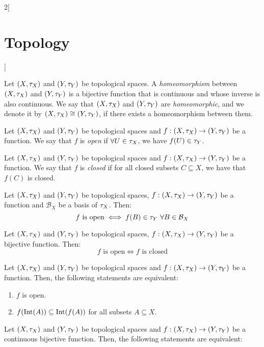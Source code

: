 \documentclass[../../../main.tex]{subfiles}
\begin{document}
\begin{multicols}{2}[\section{Topology}]
\begin{proposition}
  \end{proposition}
  \begin{definition}
    Let $(X,\tau_X)$ and $(Y,\tau_Y)$ be topological spaces. A \emph{homeomorphism} between $(X,\tau_X)$ and $(Y,\tau_Y)$ is a bijective function that is continuous and whose inverse is also continuous. We say that $(X,\tau_X)$ and $(Y,\tau_Y)$ are \emph{homeomorphic}, and we denote it by $(X,\tau_X)\cong(Y,\tau_Y)$, if there exists a homeomorphism between them.
  \end{definition}
  \begin{definition}
    Let $(X,\tau_X)$ and $(Y,\tau_Y)$ be topological spaces and $f:(X,\tau_X)\rightarrow (Y,\tau_Y)$ be a function. We say that $f$ is \emph{open} if $\forall U\in\tau_X$, we have $f(U)\in \tau_Y$.
  \end{definition}
  \begin{definition}
    Let $(X,\tau_X)$ and $(Y,\tau_Y)$ be topological spaces and $f:(X,\tau_X)\rightarrow (Y,\tau_Y)$ be a function. We say that $f$ is \emph{closed} if for all closed subsets $C\subseteq X$, we have that $f(C)$ is closed.
  \end{definition}
  \begin{theorem}
    Let $(X,\tau_X)$ and $(Y,\tau_Y)$ be topological spaces, $f:(X,\tau_X)\rightarrow (Y,\tau_Y)$ be a function and $\mathcal{B}_X$ be a basis of $\tau_X$. Then: $$f\text{ is open}\iff f(B)\in\tau_Y\ \forall B\in \mathcal{B}_X$$
  \end{theorem}
  \begin{theorem}
    Let $(X,\tau_X)$ and $(Y,\tau_Y)$ be topological spaces, $f:(X,\tau_X)\rightarrow (Y,\tau_Y)$ be a bijective function. Then: $$f\text{ is open}\iff f\text{ is closed}$$
  \end{theorem}
  \begin{proposition}
    Let $(X,\tau_X)$ and $(Y,\tau_Y)$ be topological spaces and $f:(X,\tau_X)\rightarrow (Y,\tau_Y)$ be a function. Then, the following statements are equivalent:
    \begin{enumerate}
      \item $f$ is open.
      \item $f(\operatorname{Int}(A))\subseteq \operatorname{Int}(f(A))$ for all subsets $A\subseteq X$.
    \end{enumerate}
  \end{proposition}
  \begin{proposition}
    Let $(X,\tau_X)$ and $(Y,\tau_Y)$ be topological spaces and $f:(X,\tau_X)\rightarrow (Y,\tau_Y)$ be a continuous bijective function. Then, the following statements are equivalent:

\end{proposition}
\end{multicols}
\end{document}

